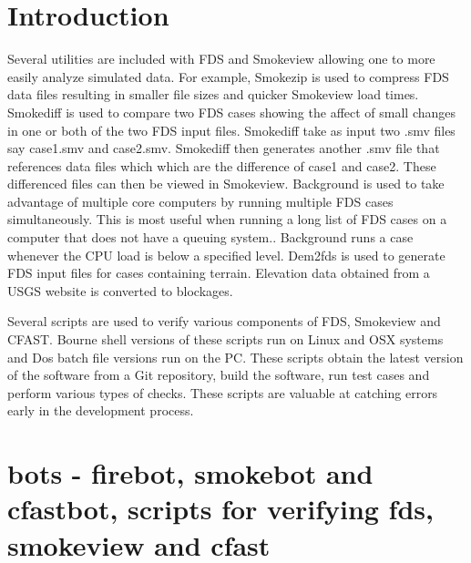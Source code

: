 \documentclass[11pt,twoside]{book}
\begin{document}
\chapter{Introduction}

Several utilities are included with FDS and Smokeview allowing one
to more easily analyze simulated data.  For example, Smokezip is used to compress FDS data files resulting in smaller file sizes and quicker Smokeview load times.  Smokediff is used
to compare two FDS cases showing the affect of small changes in one or both of the two FDS input files.  Smokediff take as input two .smv files say case1.smv and case2.smv.    Smokediff then generates another .smv file that references data files which which are the
difference of case1 and case2.  These differenced files can then be viewed in Smokeview.  Background is used to take advantage of multiple
core computers by running multiple FDS cases simultaneously.  This is most useful when running
a long list of FDS cases on a computer that does not have a queuing system.. Background runs a case whenever the CPU load is below a specified level.
Dem2fds is used to generate FDS input files for cases  containing terrain.  
Elevation data obtained from a USGS website is converted to blockages.  

Several scripts are used to verify various components of FDS, Smokeview and CFAST.
Bourne shell versions of these scripts run on Linux and OSX systems and Dos batch file versions run on the PC.  These scripts obtain the latest version of the 
software from a Git repository, build the software, run test cases and perform various types of checks.  
These scripts are valuable at catching errors early in the development process.





\chapter{bots - firebot, smokebot and cfastbot, scripts for verifying fds, smokeview and cfast}



\end{document}
